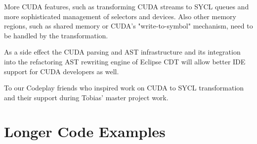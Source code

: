 \documentclass[sigconf]{acmart}
\newcommand{\inputcode}[2]{}
\newcommand{\inputsycl}[2]{}
\newcommand{\tcode}[1]{\texttt{#1}}
\begin{document}
More CUDA features, such as transforming CUDA streams to SYCL queues and more sophisticated management of selectors and devices. Also other memory regions, such as shared memory or CUDA's "write-to-symbol" mechanism, need to be handled by the transformation. 

As a side effect the CUDA parsing and AST infrastructure and its integration into the refactoring AST rewriting engine of Eclipse CDT will allow better IDE support for CUDA developers as well. 


%
\begin{acks}
To our Codeplay friends who inspired work on CUDA to SYCL transformation and their support during Tobias' master project work.
\end{acks}

%



% 
\appendix

\section{Longer Code Examples}
\lstset{basicstyle=\footnotesize\ttfamily}
\inputcode{cuda-main.cpp}{\tcode{main()} calling CUDA matrix multiplication kernel}

\inputsycl{sycl-matrix-main.cpp}{Complete converted SYCL matrix multiplication}
\end{document}
